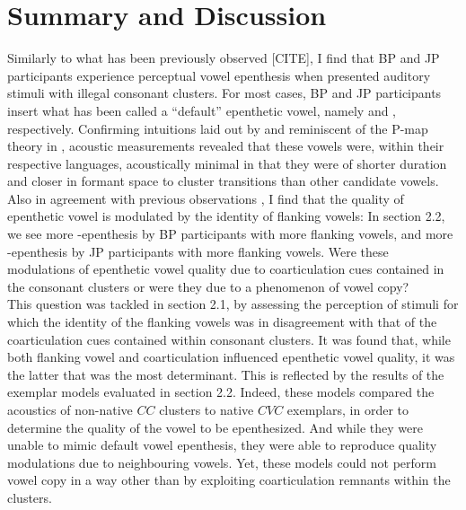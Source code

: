 \newpage
\section{Summary and Discussion}


{\color{blue}Similarly to what has been previously observed \cite{dupoux1999, dehaene2000, dupoux2011, monahan2009, mattingley2015}[CITE], I find that BP and JP participants experience perceptual vowel epenthesis when presented auditory stimuli with illegal consonant clusters. For most cases, BP and JP participants insert what has been called a ``default'' epenthetic vowel, namely  and , respectively. Confirming intuitions laid out by \cite{dupoux2011} and reminiscent of the {\color{red}P-map theory in \cite{steriade2001}}, acoustic measurements revealed that these vowels were, within their respective languages, acoustically minimal in that they were of shorter duration and closer in formant space to cluster transitions than other candidate vowels. \\

Also in agreement with previous observations \cite{dupoux2011}, I find that the quality of epenthetic vowel is modulated by the identity of flanking vowels: In {\color{red}section 2.2}, we see more -epenthesis by BP participants with more  flanking vowels, and more -epenthesis by JP participants with more  flanking vowels. Were these modulations of epenthetic vowel quality due to coarticulation cues contained in the consonant clusters or were they due to a phenomenon of vowel copy? \\

This question was tackled in {\color{red}section 2.1}, by assessing the perception of stimuli for which the identity of the flanking vowels was in disagreement with that of the coarticulation cues contained within consonant clusters. It was found that, while both flanking vowel and coarticulation influenced epenthetic vowel quality, it was the latter that was the most determinant. This is reflected by the results of the exemplar models evaluated in {\color{red}section 2.2}. Indeed, these models compared the acoustics of non-native $CC$ clusters to native $CVC$ exemplars, in order to determine the quality of the vowel to be epenthesized. And while they were unable to mimic default vowel epenthesis, they were able to reproduce quality modulations due to neighbouring vowels. Yet, these models could not perform vowel copy in a way other than by exploiting coarticulation remnants within the clusters. \\             

}
